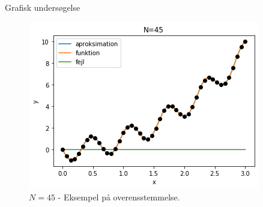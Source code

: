 \begin{frame}{Grafisk undersøgelse}
    \begin{figure}[h!]
    \begin{center}
    \includegraphics[scale=0.5]{images/N=45.png}
    \end{center}
    \caption{$N = 45$ - Eksempel på overensstemmelse.}
    \end{figure}
\end{frame}

